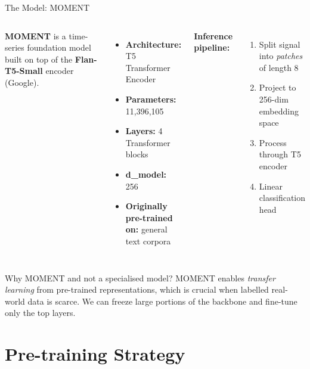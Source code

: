 \documentclass{beamer}
\begin{document}
\begin{frame}{The Model: MOMENT}
    \begin{columns}
        \textbf{MOMENT} is a time-series foundation model built on top of the \textbf{Flan-T5-Small} encoder (Google).
        \begin{itemize}
            \item \textbf{Architecture:} T5 Transformer Encoder
            \item \textbf{Parameters:} 11,396,105
            \item \textbf{Layers:} 4 Transformer blocks
            \item \textbf{d\_model:} 256
            \item \textbf{Originally pre-trained on:} general text corpora
        \end{itemize}

        \textbf{Inference pipeline:}
        \begin{enumerate}
            \item Split signal into \textit{patches} of length 8
            \item Project to 256-dim embedding space
            \item Process through T5 encoder
            \item Linear classification head
        \end{enumerate}
    \end{columns}

    \vspace{0.4cm}
    \begin{exampleblock}{Why MOMENT and not a specialised model?}
        MOMENT enables \textit{transfer learning} from pre-trained representations, which is crucial when labelled real-world data is scarce. We can freeze large portions of the backbone and fine-tune only the top layers.
    \end{exampleblock}
\end{frame}

\section{Pre-training Strategy}
\end{document}
